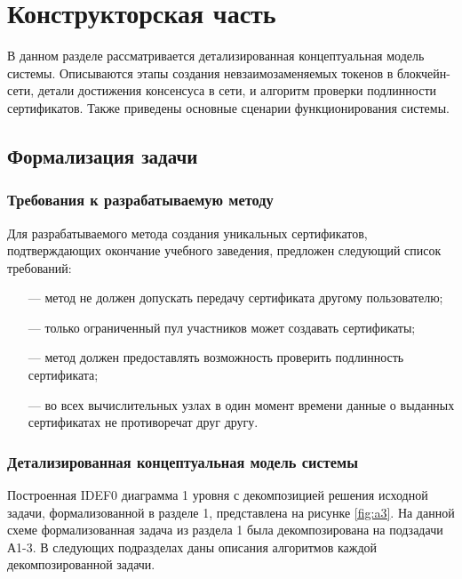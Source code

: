\section{Конструкторская часть}

В данном разделе рассматривается детализированная концептуальная модель системы. Описываются этапы создания невзаимозаменяемых токенов в блокчейн-сети, детали достижения консенсуса в сети, и алгоритм проверки подлинности сертификатов. Также приведены основные сценарии функционирования системы.

\subsection{Формализация задачи}

\subsubsection{Требования к разрабатываемую методу}
 
Для разрабатываемого метода создания уникальных сертификатов, подтверждающих окончание учебного заведения, предложен следующий список требований:
\begin{itemize}[leftmargin=1.6\parindent]
	\item[---] метод не должен допускать передачу сертификата другому пользователю;
	\item[---] только ограниченный пул участников может создавать сертификаты;
	\item[---] метод должен предоставлять возможность проверить подлинность сертификата;
	\item[---] во всех вычислительных узлах в один момент времени данные о выданных сертификатах не противоречат друг другу.
\end{itemize}


\subsubsection{Детализированная концептуальная модель системы}

Построенная IDEF0 диаграмма 1 уровня с декомпозицией решения исходной задачи, формализованной в разделе 1, представлена на рисунке \ref{fig:a3}. На данной схеме формализованная задача из раздела 1 была декомпозирована на подзадачи А1-3. В следующих подразделах даны описания алгоритмов каждой декомпозированной задачи.

